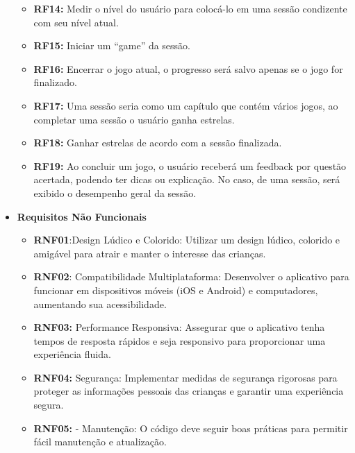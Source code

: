 \begin{itemize}
\begin{itemize}
        \item \textbf{RF14:} Medir o nível do usuário para colocá-lo em uma sessão condizente com seu nível atual.

        \item \textbf{RF15:} Iniciar um “game” da sessão.

        \item \textbf{RF16:} Encerrar o jogo atual, o progresso será salvo apenas se o jogo for finalizado.

        \item \textbf{RF17:} Uma sessão seria como um capítulo que contém vários jogos, ao completar uma sessão o usuário ganha estrelas.

        \item \textbf{RF18:} Ganhar estrelas de acordo com a sessão finalizada.

        \item \textbf{RF19:} Ao concluir um jogo, o usuário receberá um feedback por questão acertada, podendo ter dicas ou explicação. No caso, de uma sessão, será exibido o desempenho geral da sessão.
        
    \end{itemize}
    \item \textbf{Requisitos Não Funcionais}    
    \begin{itemize}

        \item \textbf{RNF01}:Design Lúdico e Colorido: Utilizar um design lúdico, colorido e amigável para atrair e manter o interesse das crianças.

        \item \textbf{RNF02}: Compatibilidade Multiplataforma: Desenvolver o aplicativo para funcionar em dispositivos móveis (iOS e Android) e computadores, aumentando sua acessibilidade.

        \item \textbf{RNF03:} Performance Responsiva: Assegurar que o aplicativo tenha tempos de resposta rápidos e seja responsivo para proporcionar uma experiência fluida.

        \item \textbf{RNF04:} Segurança: Implementar medidas de segurança rigorosas para proteger as informações pessoais das crianças e garantir uma experiência segura.

        \item \textbf{RNF05:} - Manutenção: O código deve seguir boas práticas para permitir fácil manutenção e atualização.


\end{itemize}
\end{itemize}
